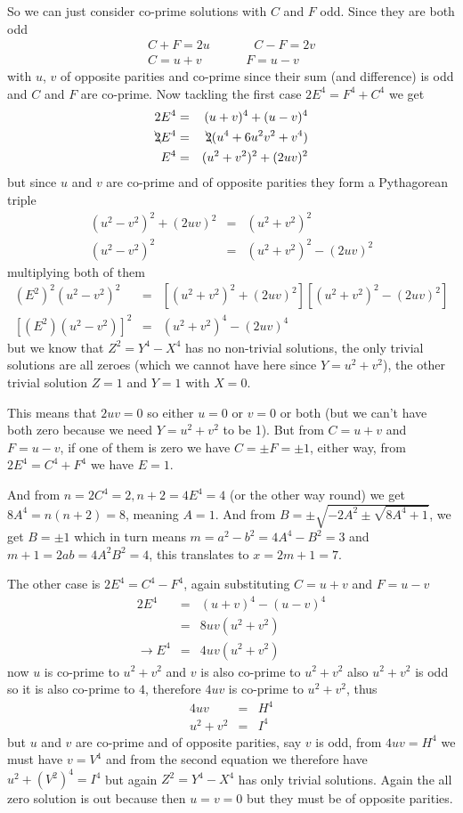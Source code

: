 \documentclass[aps,preprint,preprintnumbers,nofootinbib,showpacs,prd]{revtex4-1}
\newcommand{\nbea}{\begin{eqnarray*}}
\newcommand{\neea}{\end{eqnarray*}}
\begin{document}
So we can just consider co-prime solutions with $C$ and $F$ odd. Since they are both odd
%
\nbea
C + F = 2u  ~~~~~~~~~~~~~~~~ C - F = 2v \\
C = u + v    ~~~~~~~~~~~~~~~~ F = u - v
\neea
%
with $u$, $v$ of opposite parities and co-prime since their sum (and difference) is odd and $C$ and $F$ are co-prime. Now tackling the first case $2E^4 = F^4 + C^4$ we get
%
\nbea
2E^4 & = & (u + v)^4 + (u - v)^4 \\
\bcancel{2}E^4& = & \bcancel{2}(u^4 + 6u^2v^2 + v^4) \\
E^4 & = & (u^2 + v^2)^2 + (2uv)^2
\neea
%
but since $u$ and $v$ are co-prime and of opposite parities they form a Pythagorean triple
%
\nbea
(u^2 - v^2)^2 + (2uv)^2 & = & (u^2 + v^2)^2 \\
(u^2 - v^2)^2 & = & (u^2 + v^2)^2 - (2uv)^2
\neea
%
multiplying both of them
%
\nbea
(E^2)^2 (u^2 - v^2)^2 & = & \left \lbrack (u^2 + v^2)^2 + (2uv)^2 \right \rbrack \left \lbrack (u^2 + v^2)^2 - (2uv)^2 \right \rbrack \\
\left \lbrack (E^2) (u^2 - v^2) \right \rbrack^2 & = & (u^2 + v^2)^4 - (2uv)^4
\neea
%
but we know that $Z^2 = Y^4 - X^4$ has no non-trivial solutions, the only trivial solutions are all zeroes (which we cannot have here since $Y = u^2 + v^2$), the other trivial solution $Z = 1$ and $Y=1$ with $X = 0$.

This means that $2uv = 0$ so either $u=0$ or $v = 0$ or both (but we can't have both zero because we need $Y = u^2 + v^2$ to be 1). But from $C = u + v$ and $F = u - v$, if one of them is zero we have $C = \pm F = \pm 1$, either way, from $2E^4 = C^4 + F^4$ we have $E = 1$.

And from $n = 2C^4 = 2, n + 2 = 4E^4 = 4$ (or the other way round) we get $8A^4 = n(n+2) = 8$, meaning $A = 1$. And from $B = \pm \sqrt{-2A^2 \pm\sqrt{8A^4 + 1}}$, we get $B = \pm 1$ which in turn means $m = a^2 - b^2 = 4A^4 - B^2 = 3$ and $m + 1 = 2ab = 4A^2B^2 = 4$, this translates to $x = 2m+1 = 7$.

The other case is $2E^4 = C^4 - F^4$, again substituting $C = u + v$ and $F = u-v$
%
\nbea
2E^4 & = & (u + v)^4 - (u - v)^4 \\
& = & 8uv(u^2 + v^2) \\
\to E^4 & = & 4uv(u^2 + v^2)
\neea
%
now $u$ is co-prime to $u^2 + v^2$ and $v$ is also co-prime to $u^2 + v^2$ also $u^2 + v^2$ is odd so it is also co-prime to $4$, therefore $4uv$ is co-prime to $u^2 + v^2$, thus
%
\nbea
4uv & = & H^4 \\
u^2 + v^2 & = & I^4
\neea
%
but $u$ and $v$ are co-prime and of opposite parities, say $v$ is odd, from $4uv = H^4$ we must have $v = V^4$ and from the second equation we therefore have $u^2 + (V^2)^4 = I^4$ but again $Z^2 = Y^4 - X^4$ has only trivial solutions. Again the all zero solution is out because then $u = v = 0$ but they must be of opposite parities.
\end{document}

